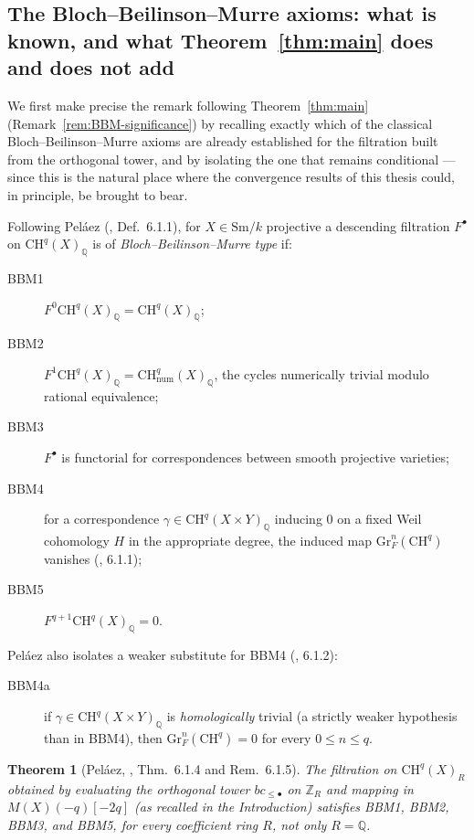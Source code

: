 \documentclass[12pt,a4paper]{article}
\newtheorem{theorem}{Theorem}[section]
\theoremstyle{definition}
\newcommand{\Sm}{\mathrm{Sm}}
\newcommand{\Gr}{\mathrm{Gr}}
\newcommand{\CH}{\mathrm{CH}}
\newcommand{\Z}{\mathbb{Z}}
\newcommand{\Q}{\mathbb{Q}}
\begin{document}
\subsection*{The Bloch--Beilinson--Murre axioms: what is known, and what
Theorem~\ref{thm:main} does and does not add}

We first make precise the remark following Theorem~\ref{thm:main}
(Remark~\ref{rem:BBM-significance}) by recalling exactly which of the classical
Bloch--Beilinson--Murre axioms are already established for the filtration built
from the orthogonal tower, and by isolating the one that remains conditional —
since this is the natural place where the convergence results of this thesis
could, in principle, be brought to bear.

Following Peláez (\cite{Pel17}, Def.~6.1.1), for $X\in\Sm/k$ projective a
descending filtration $F^\bullet$ on $\CH^q(X)_\Q$ is of \emph{Bloch--Beilinson--Murre
type} if:
\begin{description}
\item[BBM1] $F^0\CH^q(X)_\Q=\CH^q(X)_\Q$;
\item[BBM2] $F^1\CH^q(X)_\Q=\CH^q_{\mathrm{num}}(X)_\Q$, the cycles numerically
  trivial modulo rational equivalence;
\item[BBM3] $F^\bullet$ is functorial for correspondences between smooth
  projective varieties;
\item[BBM4] for a correspondence $\gamma\in\CH^q(X\times Y)_\Q$ inducing $0$ on a
  fixed Weil cohomology $H$ in the appropriate degree, the induced map
  $\Gr^n_F(\CH^q)$ vanishes (\cite{Pel17}, 6.1.1);
\item[BBM5] $F^{q+1}\CH^q(X)_\Q=0$.
\end{description}
Peláez also isolates a weaker substitute for BBM4 (\cite{Pel17}, 6.1.2):
\begin{description}
\item[BBM4a] if $\gamma\in\CH^q(X\times Y)_\Q$ is \emph{homologically} trivial
  (a strictly weaker hypothesis than in BBM4), then $\Gr^n_F(\CH^q)=0$ for every
  $0\leq n\leq q$.
\end{description}

\begin{theorem}[Peláez, \cite{Pel17}, Thm.~6.1.4 and Rem.~6.1.5]\label{thm:Pel-BBM1235}
The filtration on $\CH^q(X)_R$ obtained by evaluating the orthogonal tower
$bc_{\leq\bullet}$ on $\Z_R$ and mapping in $M(X)(-q)[-2q]$ (as recalled in the
Introduction) satisfies BBM1, BBM2, BBM3, and BBM5, for \emph{every} coefficient
ring $R$, not only $R=\Q$.
\end{theorem}
\end{document}
